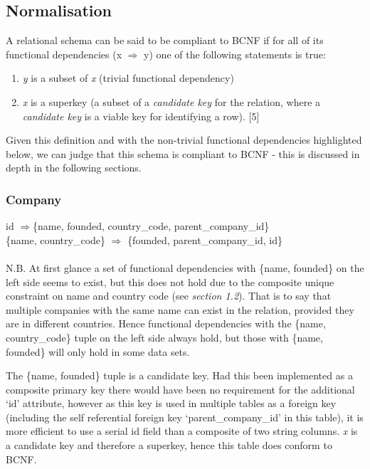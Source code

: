 \documentclass[12pt]{article}
\begin{document}
\subsection{Normalisation}
A relational schema can be said to be compliant to BCNF if for all of its functional dependencies (x $\Rightarrow$ y) one of the following statements is true:
 \begin{enumerate}
 \item \emph{y} is a subset of \emph{x} (trivial functional dependency)
\item \emph{x} is a superkey (a subset of a \emph{candidate key} for the relation, where a \emph{candidate key} is a viable key for identifying a row). [5]
\end{enumerate}
Given this definition and with the non-trivial functional dependencies highlighted below, we can judge that this schema is compliant to BCNF - this is discussed in depth in the following sections.

\subsubsection{Company}

id $\Rightarrow${\{name, founded, country\_code, parent\_company\_id\}} \\
\{{name, country\_code\}} $\Rightarrow$ {\{founded, parent\_company\_id, id\}} \\

\\ N.B. At first glance a set of functional dependencies with \{{name,  founded}\} on the left side seems to exist, but this does not hold due to the composite unique constraint on name and country code (see \emph{section 1.2}).  That is to say that multiple companies with the same name can exist in the relation, provided they are in different countries. Hence functional dependencies with the \{{name, country\_code\}} tuple on the left side always hold, but those with \{{name, founded\}} will only hold in some data sets.

The \{{name, founded\}} tuple is a candidate key. Had this been implemented as a composite primary key there would have been no requirement for the additional `id' attribute, however as this key is used in multiple tables as a foreign key (including the self referential foreign key `parent\_company\_id' in this table), it is more efficient to use a serial id field than a composite of two string columns. \emph{x} is a candidate key and therefore a superkey, hence this table does conform to BCNF.
\end{document}
